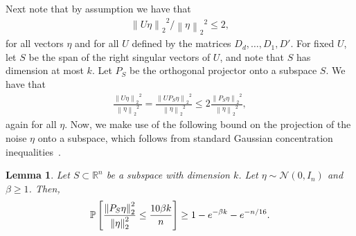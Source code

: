 \documentclass[11pt]{article}
\newtheorem{lemma}[theorem]{Lemma}
\newcommand{\Tnorm}{}
\newcommand\norm[2][\Tnorm]{\ensuremath{{\left\|#2\right\|}_{#1}}}
\newcommand\Tex{}
\newcommand\PR[2][\Tex]{
\ifthenelse{\equal{#1}{}}{{\mathbb P}\left[#2\right]}{\ensuremath{{\mathbb P}_{#1}\left[ #2\right]}}}
\newcommand\reals{\mathbb R}
\newcommand{\PS}{P_S}
\begin{document}
Next note that by assumption we have that 
\begin{align}
\label{eq:ineqU}
\norm[2]{U \eta }^2 / \norm[2]{\eta}^2 \leq 2,
\end{align}
for all vectors $\eta$ and for all $U$ defined by the matrices $D_d,\ldots, D_1,D'$. 
For fixed $U$, let $S$ be the span of the right singular vectors of $U$, and note that $S$ has dimension at most $k$.  Let $\PS$ be the orthogonal projector onto a subspace $S$.  We have that 
\begin{align*}
\frac{\norm[2]{U \eta}^2}{ \norm[2]{\eta}^2} =\frac{\norm[2]{U P_S \eta}^2}{ \norm[2]{\eta}^2}   \leq 2\frac{\norm[2]{\PS \eta}^2}{\norm[2]{ \eta}^2},
\end{align*}
again for all $\eta$.
Now, we make use of the following bound on the projection of the noise $\eta$ onto a subspace, which follows from standard Gaussian concentration inequalities~\citep[Lem.~1]{laurent_adaptive_2000}. 
\begin{lemma}
\label{lem:noise-projection}
Let $S \subset \reals^n$ be a subspace with dimension $k$.  Let $\eta \sim \mathcal{N}(0, I_n)$ and $\beta \geq 1$.  Then,
\[
\PR{ \frac{\norm[2]{\PS \eta}^2}{\norm[2]{ \eta}^2} \leq \frac{10 \beta k}{n}} \geq 1 - e^{-\beta k} - e^{-n/16}.
\]
\end{lemma}
\end{document}

